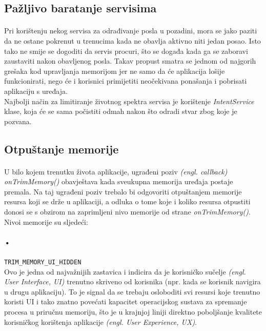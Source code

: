 \documentclass[times, utf8, zavrsni]{fer}
\begin{document}
\subsection{Pažljivo baratanje servisima}
\paragraph{}
Pri korištenju nekog servisa za odrađivanje posla u pozadini, mora se jako paziti da  ne ostane pokrenut u trenucima kada ne obavlja aktivno niti jedan posao. Isto tako ne smije se dogoditi da servis procuri, što se događa kada ga se zaboravi zaustaviti nakon obavljenog posla. Takav propust smatra se jednom od najgorih grešaka kod upravljanja memorijom jer ne samo da će aplikacija lošije funkcionirati, nego će i korisnici primijetiti neočekivana ponašanja i pobrisati aplikaciju s uređaja.\\

Najbolji način za limitiranje životnog spektra servisa je korištenje \textit{IntentService} klase, koja će se sama počistiti odmah nakon što odradi stvar zbog koje je pozvana.

\subsection{Otpuštanje memorije}
\paragraph{}
U bilo kojem trenutku života aplikacije, ugrađeni poziv \textit{(engl. callback)} \textit{onTrimMemory()} obavještava kada sveukupna memorija uređaja postaje premala. Na taj ugrađeni poziv trebalo bi odgovoriti otpuštanjem memorije resursa koji se drže u aplikaciji, a odluka o tome koje i koliko resursa otpustiti donosi se s obzirom na zaprimljeni nivo memorije od strane \textit{onTrimMemory()}. Nivoi memorije su sljedeći:

\paragraph{•}
\verb|TRIM_MEMORY_UI_HIDDEN|\\
Ovo je jedna od najvažnijih zastavica i indicira da je korisničko sučelje \textit{(engl. User Interface, UI)} trenutno skriveno od korisnika (npr. kada se korisnik navigira u drugu aplikaciju). To je signal da se trebaju osloboditi svi resursi koje trenutno koristi UI i tako znatno povećati kapacitet operacijskog sustava za spremanje procesa u priručnu memoriju, što je u krajnjoj liniji direktno poboljšanje kvalitete korisničkog korištenja aplikacije \textit{(engl. User Experience, UX)}.
\end{document}
